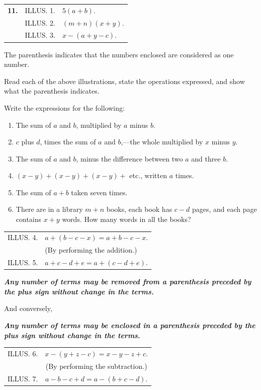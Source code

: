 \documentclass{book}
\begin{document}
\begin{tabular}{lcl}
\textbf{11.}& ILLUS. 1.&  $5 (a + b)$.\\
&ILLUS. 2.& $(m + n) (x + y)$.\\
&ILLUS. 3.& $x - (a + y - c)$.\\
\end{tabular}

The parenthesis indicates that the numbers enclosed are considered
as one number.

Read each of the above illustrations, state the operations
expressed, and show what the parenthesis indicates.

Write the expressions for the following:

\begin{enumerate}
\item The sum of $a$ and $b$, multiplied by $a$ minus $b$.

\item $c$ plus $d$, times the sum of $a$ and $b$,---the whole
multiplied by $x$ minus $y$.

\item The sum of $a$ and $b$, minus the difference between two $a$
and three $b$.

\item $(x - y) + (x - y) + (x - y) +$  etc., written $a$ times.

\item The sum of $a + b$ taken seven times.

\item There are in a library $m + n$ books, each book has $c - d$
pages, and each page contains $x + y$ words. How many words in all
the books?
\end{enumerate}

\begin{tabular}{ll}
ILLUS. 4.& $a + (b - c - x) = a + b - c - x$.\\
&(By performing the addition.)\\
ILLUS. 5.&  $a + c - d + e = a + (c - d + e)$.
\end{tabular}

\textbf{\textit{Any number of terms may be removed from a
parenthesis preceded by the plus sign without change in the
terms.}}

And conversely,

\textbf{\textit{Any number of terms may be enclosed in a
parenthesis preceded by the plus sign without change in the
terms}.}

\begin{tabular}{lc}
ILLUS. 6. &$x - (y + z - c) = x - y - z + c$.\\
&(By performing the subtraction.)\\
ILLUS. 7. &$a - b - c + d = a - (b + c - d)$.
\end{tabular}
\end{document}
